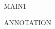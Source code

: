 
MAIN{\mktsEnStyleMarkMain{}1}

\begin{mktsEnNotes}{\mktsEnStyleMarkNotes{}\mktsEnMarkAfter{}}ANNOTATION

\end{mktsEnNotes}


